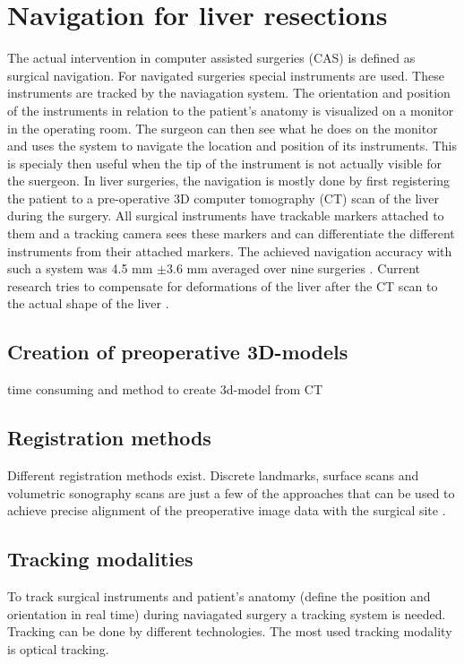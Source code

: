 \section{Navigation for liver resections}
The actual intervention in computer assisted surgeries (CAS) is defined as
surgical navigation. For navigated surgeries special instruments are used. These
instruments are tracked by the naviagation system. The orientation and position
of the instruments in relation to the patient's anatomy is visualized on a
monitor in the operating room. The surgeon can then see what he does on the
monitor and uses the system to navigate the location and position of its
instruments. This is specialy then useful when the tip of the instrument is not
actually visible for the suergeon. 
In liver surgeries, the navigation is mostly done by first registering the patient to a pre-operative 3D
computer tomography (CT) scan of the liver during the surgery. All surgical
instruments have trackable markers attached to them and a tracking camera sees
these markers and can differentiate the different instruments from their attached
markers. The achieved
navigation accuracy with such a system was 4.5 mm $\pm$3.6 mm averaged over nine surgeries \cite{peterhans2011navigation}.
Current research tries to compensate for deformations of the liver after the CT
scan to the actual shape of the liver \cite{clements2017deformation}
\cite{clements2015validation}. 
\subsection{Creation of preoperative 3D-models}


\cite{numminen2005preoperative} time consuming and method to create 3d-model
from CT

\subsection{Registration methods}
Different registration methods exist. Discrete landmarks, surface scans and
volumetric sonography scans are just a few of the approaches that can be
used to achieve precise alignment of the preoperative image data with the
surgical site \cite{banz2016intraoperative}.

\subsection{Tracking modalities}
To track surgical instruments and patient's anatomy (define the position and
orientation in real time) during naviagated surgery a tracking system is needed.
Tracking can be done by different technologies. The most used tracking
modality is optical tracking. 

